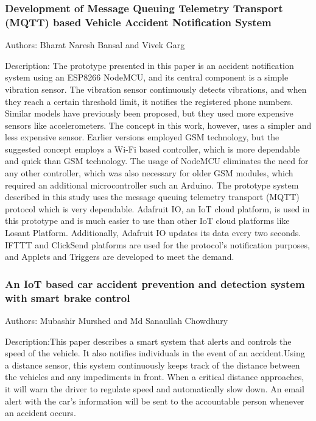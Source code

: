 \documentclass[ 12pt,a4paper,twocolumn,fleqn]{article}
\begin{document}
\begin{adjustwidth}{3.5em}{0pt}
\hspace{0.2cm}

\subsubsection{Development of Message Queuing Telemetry Transport (MQTT) based Vehicle Accident Notification System}

Authors: Bharat Naresh Bansal and Vivek Garg

Description: The prototype presented in this paper is an accident notification system using an ESP8266 NodeMCU, and its central component is a simple vibration sensor. The vibration sensor continuously detects vibrations, and when they reach a certain threshold limit, it notifies the registered phone numbers. Similar models have previously been proposed, but they used more expensive sensors like accelerometers. The concept in this work, however, uses a simpler and less expensive sensor. Earlier versions employed GSM technology, but the suggested concept  employs a Wi-Fi based controller, which is more dependable and quick than GSM technology. The usage of NodeMCU eliminates the need for any other controller, which was also necessary for older GSM modules, which required an additional microcontroller such an Arduino. The prototype system described in this study uses the message queuing
telemetry transport (MQTT) protocol which is very dependable. Adafruit IO, an IoT cloud platform, is used in this prototype and is much easier to use than other IoT cloud platforms like Losant Platform. Additionally, Adafruit IO updates its data every two seconds. IFTTT and ClickSend platforms are used for the protocol's notification purposes, and Applets and Triggers are developed to meet the demand.


\hspace{0.2cm}

\subsubsection{An IoT based car accident prevention and detection system with smart brake control}

Authors: Mubashir Murshed and Md Sanaullah Chowdhury
 
Description:This paper describes a smart system that alerts and controls the speed of the vehicle. It also notifies individuals in the event of an accident.Using a distance sensor, this system continuously keeps track of the distance between the vehicles and any impediments in front. When a critical distance approaches, it will warn the driver to regulate speed and automatically slow down. An email alert with the car's information will be sent to the accountable person whenever an accident occurs.



\end{adjustwidth}
\end{document}
